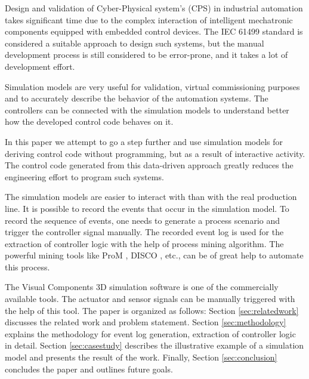 \documentclass[conference]{IEEEtran}
\begin{document}
Design and validation of Cyber-Physical system’s (CPS) \cite{lee2017introduction}  in industrial automation takes significant time due to the complex interaction of intelligent mechatronic components equipped with embedded control devices. The IEC 61499 standard \cite{iec61499part12012} is considered a suitable approach to design such systems, but the manual development process is still considered to be error-prone, and it takes a lot of development effort. 

Simulation models are very useful for validation, virtual commissioning purposes and to accurately describe the behavior of the automation systems. The controllers can be connected with the simulation models to understand better how the developed control code behaves on it.

In this paper we attempt to go a step further and use simulation models for deriving control code without programming, but as a result of interactive activity. The control code generated from this data-driven approach greatly reduces the engineering effort to program such systems.

The simulation models are easier to interact with than with the real production line. It is possible to record the events that occur in the simulation model. To record the sequence of events, one needs to generate a process scenario and trigger the controller signal manually. The recorded event log is used for the extraction of controller logic with the help of process mining algorithm. The powerful mining tools like ProM \cite{van2005prom}, DISCO \cite{gunther2012disco}, etc., can be of great help to automate this process.

The Visual Components \cite{visualcomponent} 3D simulation software is one of the commercially available tools. The actuator and sensor signals can be manually triggered with the help of this tool. The paper is organized as follows: Section \ref{sec:relatedwork}  discusses the related work and problem statement. Section \ref{sec:methodology} explains the methodology for event log generation, extraction of controller logic in detail. Section \ref{sec:casestudy}  describes the illustrative example of a simulation model and presents the result of the work. Finally, Section \ref{sec:conclusion} concludes the paper and outlines future goals.
\end{document}
